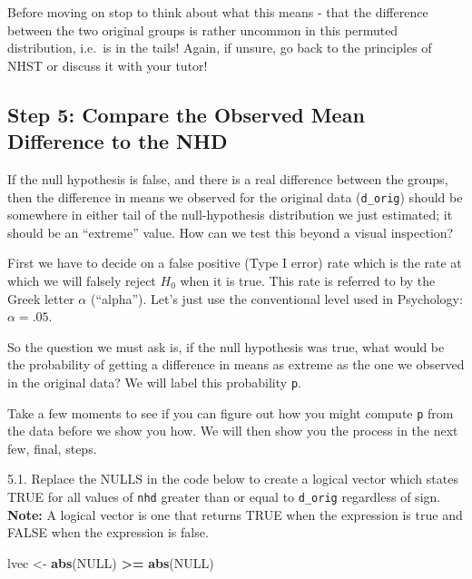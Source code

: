 \documentclass[]{book}
\newenvironment{Shaded}{\begin{snugshade}}{\end{snugshade}}
\newcommand{\KeywordTok}[1]{\textcolor[rgb]{0.13,0.29,0.53}{\textbf{#1}}}
\newcommand{\NormalTok}[1]{#1}
\newcommand{\OperatorTok}[1]{\textcolor[rgb]{0.81,0.36,0.00}{\textbf{#1}}}
\newcommand{\OtherTok}[1]{\textcolor[rgb]{0.56,0.35,0.01}{#1}}
\newcommand{\StringTok}[1]{\textcolor[rgb]{0.31,0.60,0.02}{#1}}
\begin{document}
Before moving on stop to think about what this means - that the difference between the two original groups is rather uncommon in this permuted distribution, i.e.~is in the tails! Again, if unsure, go back to the principles of NHST or discuss it with your tutor!

\hypertarget{Ch5InClassQueT5}{%
\subsection{Step 5: Compare the Observed Mean Difference to the NHD}\label{Ch5InClassQueT5}}

If the null hypothesis is false, and there is a real difference between the groups, then the difference in means we observed for the original data (\texttt{d\_orig}) should be somewhere in either tail of the null-hypothesis distribution we just estimated; it should be an ``extreme'' value. How can we test this beyond a visual inspection?

First we have to decide on a false positive (Type I error) rate which is the rate at which we will falsely reject \(H_0\) when it is true. This rate is referred to by the Greek letter \(\alpha\) (``alpha''). Let's just use the conventional level used in Psychology: \(\alpha = .05\).

So the question we must ask is, if the null hypothesis was true, what would be the probability of getting a difference in means as extreme as the one we observed in the original data? We will label this probability \texttt{p}.

Take a few moments to see if you can figure out how you might compute \texttt{p} from the data before we show you how. We will then show you the process in the next few, final, steps.

5.1. Replace the NULLS in the code below to create a logical vector which states TRUE for all values of \texttt{nhd} greater than or equal to \texttt{d\_orig} regardless of sign. \textbf{Note:} A logical vector is one that returns TRUE when the expression is true and FALSE when the expression is false.

\begin{Shaded}
\begin{Highlighting}[]
\NormalTok{lvec <-}\StringTok{ }\KeywordTok{abs}\NormalTok{(}\OtherTok{NULL}\NormalTok{) }\OperatorTok{>=}\StringTok{ }\KeywordTok{abs}\NormalTok{(}\OtherTok{NULL}\NormalTok{)}
\end{Highlighting}
\end{Shaded}
\end{document}
